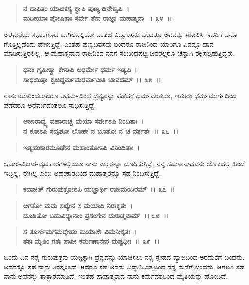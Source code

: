 \begin{verse}
\textbf{ನ ದಾಪಿತಂ ಯಾಚಕಸ್ಯ ಕ್ವಾಪಿ ಪುಣ್ಯ ದಿನೇಷ್ವಪಿ~।}\\\textbf{ಮದೀಯಾಃ ಪೋಷಿತಾಃ ಸರ್ವೇ ತೇನ ರಾಜ್ಞಾ ಮಹಾತ್ಮನಾ~।। ೩೪~।।}
\end{verse}

ಅರಮನೆಯ ಸಭಾಂಗಣದ ಬಾಗಿಲಿನಲ್ಲಿಯೇ ಎಂತಹ ವಿದ್ವಾಂಸನು ಬಂದರೂ ಅವನನ್ನು ಸೋಲಿಸಿ ಇವನಿಗೆ ಏನೂ ಗೊತ್ತಿಲ್ಲವೆಂದು ಹೇಳುತ್ತಿದ್ದೆ, ಎಂತಹ ಪುಣ್ಯದಿವಸವು ಬಂದರೂ ರಾಜನಿಂದ ಯಾರಿಗೂ ಏನನ್ನೂ ದಾನ ಮಾಡಿಸುತ್ತಿರಲಿಲ್ಲ. ಆ ಮಹಾತ್ಮನಾದ ರಾಜನಿಂದ ನನಗೆ ಸಂಬಂಧಪಟ್ಟ ಜನರೆಲ್ಲರೂ ಚೆನ್ನಾಗಿ ರಕ್ಷಿಸಲ್ಪಡುತ್ತಿದ್ದರು.

\begin{verse}
\textbf{ಧನಂ ಗೃಹೀತ್ವಾ ಕೇನಾಪಿ ಅಧರ್ಮೇ ಧರ್ಮ ಇತ್ಯಪಿ~।}\\\textbf{ಸಾಧಯಿತ್ವಾ ಕ್ವಚಿದ್ದರ್ಮಮಧರ್ಮಮಿತಿ ಚಾವದಮ್~।। ೩೫~।।}
\end{verse}

ನಾನು ಯಾರಿಂದಲಾದರೂ ಅಧರ್ಮದಿಂದ ದ್ರವ್ಯವನ್ನು ಪಡೆದರೆ ಧರ್ಮವೆಂತಲೂ, ಇತರರು ಧರ್ಮಮಾರ್ಗದಿಂದ ಪಡೆದರೂ ಅಧರ್ಮವೆಂತಲೂ ಸಾಧಿಸುತ್ತಿದ್ದೆ.

\begin{verse}
\textbf{ಆಚಾರಾದ್ವ್ಯ ವಹಾರಾಚ್ಚ ಮಯಾ ಸರ್ವೇಽಪಿ ನಿಂದಿತಾಃ~।}\\\textbf{ನ ಕೋಽಪಿ ಸದೃಶೋ ಲೋಕೇ ನ ಭೂತೋ ನ ಚ ವರ್ತತೇ~।। ೩೬~।।}
\end{verse}

\begin{verse}
\textbf{ಇತ್ಯಹಂಕಾರಮೂಢೇನ ಮಹಾಂತೋಽಪಿ ವಿನಿಂದಿತಾಃ~।}
\end{verse}

ಆಚಾರ-ವಿಚಾರ-ವ್ಯವಹಾರಗಳಲ್ಲಿಯೂ ನಾನು ಎಲ್ಲರನ್ನೂ ದೂಷಿಸುತ್ತಿದ್ದೆ. ನನ್ನ ಸಮಾನನಾದವನು ಲೋಕದಲ್ಲಿ ಹಿಂದೆ ಇದ್ದಿಲ್ಲ, ಈಗಿಲ್ಲ ಎಂಬ ಅಹಂಕಾರದಿಂದ ಮಹಾತ್ಮರನ್ನೂ ಸಹ ನಿಂದಿಸುತ್ತಿದ್ದೆ.

\begin{verse}
\textbf{ಕದಾಚಿತ್ ಗುರುಪುತ್ರೋಽಪಿ ಯಜ್ಞಾರ್ಥಿ ರಾಜಮಂದಿರಮ್~।। ೩೭~।।} 
\end{verse}

\begin{verse}
\textbf{ಆಗತೋ ಮಮ ಸಖ್ಯೇನ ಸ ಮಯಾಪಿ ನಿರಾಕೃತಃ~।}\\\textbf{ದೂಷಿತೋ ಬಹುವಿದ್ಯಾನಾಂ ಪ್ರಸಂಗೇನ ದುರಾತ್ಮನಾಮ್~।। ೩೮~।। }
\end{verse}

\begin{verse}
\textbf{ಸ ತೂರ್ಣಮಗಮದ್ಗೇಹಂ ಮಯಾಸೌ ವಿಮನೀಕೃತಃ~।}\\\textbf{ತತಃ ಮೃತಿಂ ಗತಃ ಪಾಪೀ ಕರ್ಮಣಾನೇನ ದುಷ್ಟಧೀಃ~।। ೩೯~।।}
\end{verse}

ಒಂದು ದಿನ ನನ್ನ ಗುರುಪುತ್ರನು ಯಜ್ಞಕ್ಕಾಗಿ ದ್ರವ್ಯವನ್ನು ಯಾಚಿಸಲು ನನ್ನ ಸ್ನೇಹದ ವ್ಯಾಜದಿಂದ ಅರಮನೆಗೆ ಬಂದನು. ಅವನನ್ನೂ ಸಹ ನಾನು ತಿರಸ್ಕರಿಸಿದೆ. ಆದರೂ ಸಹ ಅವನು ವಿದ್ಯಾನಿಮಿತ್ತದಿಂದ ನನ್ನ ಮನೆಗೆ ಬಂದನು. ಆಗಲೂ ಸಹ ನಾನು ಅವನನ್ನು ತಾತ್ಸಾರಮಾಡಿದೆ. ಇಂತಹ ಪಾಪಾತ್ಮನಾದ ನಾನು ಕರ್ಮವಶದಿಂದ ಮೃತಿಯನ್ನು ಹೊಂದಿದೆ.

